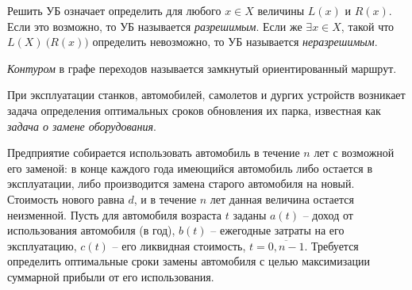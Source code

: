 \begin{definition}
  Решить УБ означает определить для любого $x \in X$ величины $L(x)$ и $R(x)$. Если это возможно, то УБ называется \emph{разрешимым}. Если же $\exists x \in X$, такой что $L(X) \ \big(R(x)\big)$ определить невозможно, то УБ называется \emph{неразрешимым}.
\end{definition}

\begin{definition}[Контур]
  \emph{Контуром} в графе переходов называется замкнутый ориентированный маршрут.
\end{definition}

\begin{definition}
  При эксплуатации станков, автомобилей, самолетов и дургих устройств возникает задача определения оптимальных сроков обновления их парка, известная как \emph{задача о замене оборудования}.

  Предприятие собирается использовать автомобиль в течение $n$ лет с возможной его заменой: в конце каждого года имеющийся автомобиль либо остается в эксплуатации, либо производится замена старого автомобиля на новый. Стоимость нового равна $d$, и в течение $n$ лет данная величина остается неизменной. Пусть для автомобиля возраста $t$ заданы $a(t)$ -- доход от использования автомобиля (в год), $b (t)$ -- ежегодные затраты на его эксплуатацию, $c(t)$ -- его ликвидная стоимость, $t = \overline{0,n-1} $. Требуется определить оптимальные сроки замены автомобиля с целью максимизации суммарной прибыли от его использования. 
\end{definition}
